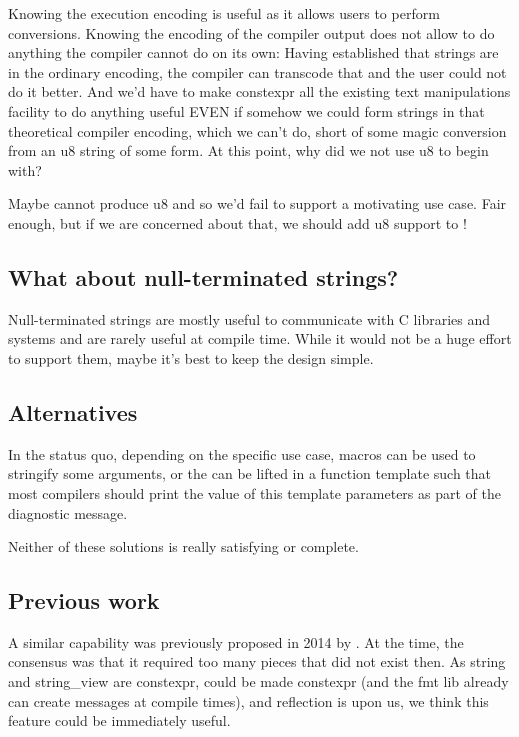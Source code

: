 \documentclass{wg21}
\begin{document}
Knowing the execution encoding is useful as it allows users to perform conversions.
Knowing the encoding of the compiler output does not allow to do anything the compiler cannot do on its own:
Having established that strings are in the ordinary encoding, the compiler can transcode that and the user could not do it better.
And we'd have to make constexpr all the existing text manipulations facility to do anything useful EVEN if somehow we could form strings in that
theoretical compiler encoding, which we can't do, short of some magic conversion from an u8 string of some form.
At this point, why did we not use u8 to begin with?

Maybe  cannot produce u8 and so we'd fail to support a motivating use case.
Fair enough, but if we are concerned about that, we should add u8 support to  !


\subsection{What about null-terminated strings?}

Null-terminated strings are mostly useful to communicate with C libraries and systems and are rarely useful at compile time.
While it would not be a huge effort to support them, maybe it's best to keep the design simple.

\subsection{Alternatives}

In the status quo, depending on the specific use case, macros can be used to stringify some arguments, or
the  can be lifted in a function template such that most compilers should print the value
of this template parameters as part of the diagnostic message.

Neither of these solutions is really satisfying or complete.

\subsection{Previous work}

A similar capability was previously proposed in 2014 by .
At the time, the consensus was that it required too many pieces that did not exist then.
As string and string_view are constexpr,  could be made constexpr (and the fmt lib already can create messages at compile times), and reflection is upon us,
we think this feature could be immediately useful.
\end{document}

